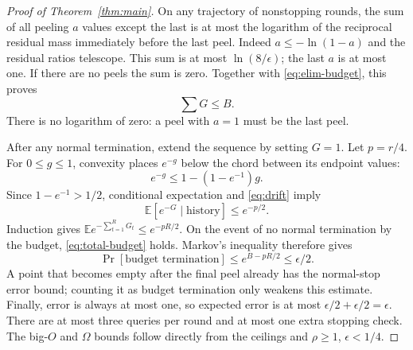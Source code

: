 \documentclass[11pt]{article}
\newcommand{\E}{\mathbb E}
\newcommand{\1}{\mathbf 1}
\begin{document}
\begin{proof}[Proof of Theorem~\ref{thm:main}]
On any trajectory of nonstopping rounds, the sum of all peeling $a$ values except the last is at most the logarithm of the reciprocal residual mass immediately before the last peel. Indeed $a\le-\ln(1-a)$ and the residual ratios telescope. This sum is at most $\ln(8/\epsilon)$; the last $a$ is at most one. If there are no peels the sum is zero. Together with \eqref{eq:elim-budget}, this proves
\begin{equation}\label{eq:total-budget}
 \sum G\le B.
\end{equation}
There is no logarithm of zero: a peel with $a=1$ must be the last peel.

After any normal termination, extend the sequence by setting $G=1$. Let $p=r/4$. For $0\le g\le1$, convexity places $e^{-g}$ below the chord between its endpoint values:
\[
 e^{-g}\le1-(1-e^{-1})g.
\]
Since $1-e^{-1}>1/2$, conditional expectation and \eqref{eq:drift} imply
\[
 \E[e^{-G}\mid\text{history}]\le e^{-p/2}.
\]
Induction gives $\E e^{-\sum_{t=1}^RG_t}\le e^{-pR/2}$. On the event of no normal termination by the budget, \eqref{eq:total-budget} holds. Markov's inequality therefore gives
\[
 \Pr[\text{budget termination}]
 \le e^{B-pR/2}\le\epsilon/2.
\]
A point that becomes empty after the final peel already has the normal-stop error bound; counting it as budget termination only weakens this estimate. Finally, error is always at most one, so expected error is at most $\epsilon/2+\epsilon/2=\epsilon$. There are at most three queries per round and at most one extra stopping check. The big-$O$ and $\Omega$ bounds follow directly from the ceilings and $\rho\ge1$, $\epsilon<1/4$.
\end{proof}
\end{document}
